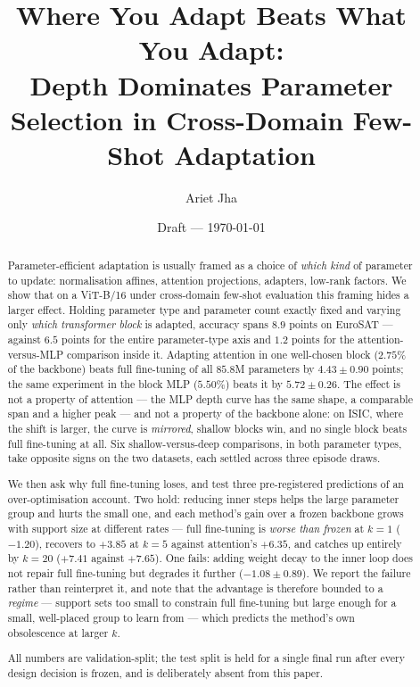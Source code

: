 \documentclass[11pt]{article}
\title{Where You Adapt Beats What You Adapt:\\
Depth Dominates Parameter Selection in Cross-Domain Few-Shot Adaptation}
\author{Ariet Jha}
\date{Draft --- \today}
\newcommand{\dd}[2]{$#1 \pm #2$}
\begin{document}
\maketitle

\begin{abstract}
Parameter-efficient adaptation is usually framed as a choice of \emph{which kind} of
parameter to update: normalisation affines, attention projections, adapters, low-rank
factors. We show that on a ViT-B/16 under cross-domain few-shot evaluation this framing
hides a larger effect. Holding parameter type and parameter count exactly fixed and
varying only \emph{which transformer block} is adapted, accuracy spans $8.9$ points on
EuroSAT --- against $6.5$ points for the entire parameter-type axis and $1.2$ points for
the attention-versus-MLP comparison inside it. Adapting attention in one well-chosen
block ($2.75\%$ of the backbone) beats full fine-tuning of all $85.8$M parameters by
\dd{4.43}{0.90} points; the same experiment in the block MLP ($5.50\%$) beats it by
\dd{5.72}{0.26}. The effect is not a property of attention --- the MLP depth curve has
the same shape, a comparable span and a higher peak --- and not a property of the
backbone alone: on ISIC, where the shift is larger, the curve is \emph{mirrored},
shallow blocks win, and no single block beats full fine-tuning at all. Six
shallow-versus-deep comparisons, in both parameter types, take opposite signs on the
two datasets, each settled across three episode draws.

We then ask why full fine-tuning loses, and test three pre-registered predictions of an
over-optimisation account. Two hold: reducing inner steps helps the large parameter
group and hurts the small one, and each method's gain over a frozen backbone grows with
support size at different rates --- full fine-tuning is \emph{worse than frozen} at
$k=1$ ($-1.20$), recovers to $+3.85$ at $k=5$ against attention's $+6.35$, and catches
up entirely by $k=20$ ($+7.41$ against $+7.65$). One fails: adding weight decay to the
inner loop does not repair full fine-tuning but degrades it further
(\dd{-1.08}{0.89}). We report the failure rather than reinterpret it, and note that the
advantage is therefore bounded to a \emph{regime} --- support sets too small to
constrain full fine-tuning but large enough for a small, well-placed group to learn
from --- which predicts the method's own obsolescence at larger $k$.

All numbers are validation-split; the test split is held for a single final run after
every design decision is frozen, and is deliberately absent from this paper.
\end{abstract}
\end{document}

